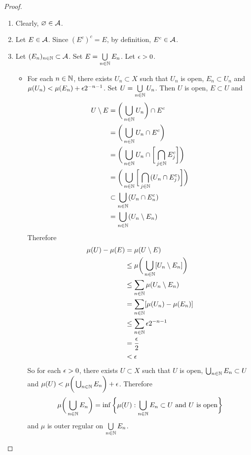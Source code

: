 \documentclass{book}
\begin{document}
	\begin{proof}\ 
		\begin{enumerate}
			\item Clearly, $\varnothing \in \mathcal{A}$.
			\item Let $E \in \mathcal{A}$. Since $(E^c)^c = E$, by definition, $E^c \in \mathcal{A}$. 
			\item Let $(E_n)_{n \in \mathbb{N}} \subset \mathcal{A}$. Set $E = \bigcup\limits_{n \in \mathbb{N}} E_n$. Let $\epsilon >0$. 
			\begin{itemize}
				\item For each $n \in \mathbb{N}$, there exists $U_n \subset X$ such that $U_n$ is open, $E_n \subset U_n$ and $\mu(U_n) < \mu(E_n) + \epsilon 2^{-n - 1 }$. Set $U = \bigcup\limits_{n\in\mathbb{N}} U_n$. Then $U$ is open, $E \subset U$ and 
				\begin{align*} 
					U \setminus E
					&= \bigg( \bigcup_{n \in \mathbb{N}} U_n \bigg) \cap  E^c \\
					&= \bigg( \bigcup_{n \in \mathbb{N}} U_n \cap E^c \bigg)  \\
					&= \bigg( \bigcup_{n \in \mathbb{N}} U_n \cap \bigg[ \bigcap_{j \in \mathbb{N}} E_j^c \bigg] \bigg) \\
					&= \bigg( \bigcup_{n \in \mathbb{N}} \bigg [ \bigcap_{j \in \mathbb{N}} (U_n \cap E_j^c)\bigg ]  \bigg) \\
					& \subset \bigcup_{n \in \mathbb{N}} (U_n \cap E_n^c)  \\
					&= \bigcup_{n \in \mathbb{N}} (U_n \setminus E_n) 
				\end{align*}
				Therefore
				\begin{align*}
					\mu(U) - \mu(E)
					&= \mu(U \setminus E) \\
					& \leq \mu \bigg(\bigcup_{n \in \mathbb{N}} [U_n \setminus E_n] \bigg) \\
					& \leq \sum\limits_{n \in \mathbb{N}} \mu(U_n \setminus E_n) \\
					&= \sum\limits_{n \in \mathbb{N}} [\mu(U_n) - \mu(E_n)] \\
					& \leq \sum\limits_{n \in \mathbb{N}} \epsilon 2^{-n-1} \\
					&= \frac{\epsilon}{2} \\
					& < \epsilon
				\end{align*}
				So for each $\epsilon >0$, there exists $U \subset X$ such that $U$ is open, $\bigcup_{n \in \mathbb{N}}E_n \subset U$ and $\mu(U) < \mu \bigg( \bigcup_{n \in \mathbb{N}} E_n \bigg) + \epsilon$. Therefore $$\mu \bigg( \bigcup_{n \in \mathbb{N}} E_n \bigg) = \inf \bigg \{ \mu(U): \bigcup_{n \in \mathbb{N}} E_n \subset U \text{ and $U$ is open} \bigg \}$$
				and $\mu$ is outer regular on $\bigcup\limits_{n \in \mathbb{N}} E_n$.

\end{itemize}
\end{enumerate}
\end{proof}
\end{document}
